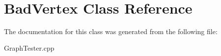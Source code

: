 \hypertarget{a01559}{}\section{Bad\+Vertex Class Reference}
\label{a01559}


The documentation for this class was generated from the following file\+:\begin{DoxyCompactItemize}
\item 
Graph\+Tester.\+cpp\end{DoxyCompactItemize}
